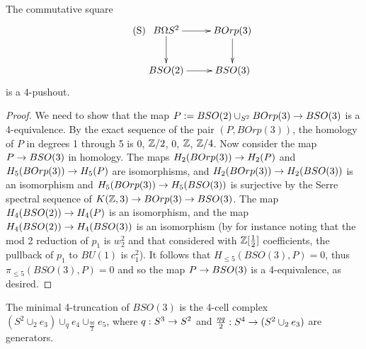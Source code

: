 \documentclass{amsart}
\begin{document}
\begin{proposition}
The commutative square
\begin{equation}\label{s2-pushout} \tag{S}
\xymatrix{
B\Omega S^2 \ar[r] \ar[d] & BOrp(3) \ar[d] \\
BSO(2) \ar[r] & BSO(3)
}
\end{equation}
is a $4$-pushout.
\end{proposition}
\begin{proof}
We need to show that the map $P := BSO(2) \cup_{S^2} BOrp(3) \rightarrow BSO(3)$ is a 4-equivalence.  By the exact sequence of the pair $(P, BOrp(3))$, the homology of $P$ in degrees 1 through 5 is $0$, $\mathbb Z/2$, $0$, $\mathbb Z$, $\mathbb Z/4$.  Now consider the map $P \rightarrow BSO(3)$ in homology.  The maps $H_2(BOrp(3)) \rightarrow H_2(P)$ and $H_5(BOrp(3)) \rightarrow H_5(P)$ are isomorphisms, and $H_2(BOrp(3)) \rightarrow H_2(BSO(3))$ is an isomorphism and $H_5(BOrp(3)) \rightarrow H_5(BSO(3))$ is surjective by the Serre spectral sequence of $K(\mathbb Z,3) \rightarrow BOrp(3) \rightarrow BSO(3)$.  The map $H_4(BSO(2)) \rightarrow H_4(P)$ is an isomorphism, and the map $H_4(BSO(2)) \rightarrow H_4(BSO(3))$ is an isomorphism (by for instance noting that the mod 2 reduction of $p_1$ is $w_2^2$ and that considered with $\mathbb Z[\frac{1}{2}]$ coefficients, the pullback of $p_1$ to $BU(1)$ is $c_1^2$).  It follows that $H_{\leq 5}(BSO(3),P) = 0$, thus $\pi_{\leq 5}(BSO(3),P) = 0$ and so the map $P \rightarrow BSO(3)$ is a 4-equivalence, as desired.
\end{proof}


\begin{corollary} \label{cor-bso3trunc}
The minimal 4-truncation of $BSO(3)$ is the 4-cell complex $(S^2 \cup_2 e_3) \cup_q e_4 \cup_{\frac{\eta q}{2}} e_5$, where $q: S^3 \rightarrow S^2$ and $\frac{\eta q}{2}: S^4 \rightarrow (S^2 \cup_2 e_3)$ are generators.
\end{corollary}
\end{document}
